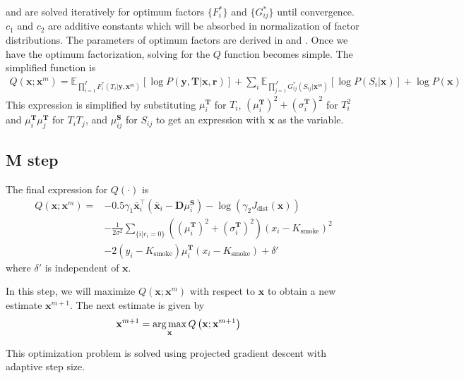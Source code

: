 and  are solved iteratively for optimum factors $ \lbrace F_i^* \rbrace $ and $ \lbrace G_{ij}^* \rbrace $ until convergence. $c_1$ and $c_2$ are additive constants which will be absorbed in normalization of factor distributions. The parameters of optimum factors are derived in  and .  Once we have the optimum factorization, solving for the $Q$ function becomes simple. The simplified function is
\begin{align}
Q(\mathbf{x}; \mathbf{x}^m) = \mathbb{E}_{ \prod_{i=1}^{I} F^*_i (T_i | \mathbf{y}, \mathbf{x}^m) } \left[ \log P \left( \mathbf{y}, \mathbf{T} | \mathbf{x}, \mathbf{r} \right) \right] + \sum_i \mathbb{E}_{ \prod_{j=1}^{J} G^*_{ij} \left( S_{ij} | \mathbf{x}^m \right) } \left[ \log P \left( S_i | \mathbf{x} \right) \right] + \log P \left( \mathbf{x} \right)
\end{align}
This expression is simplified by substituting $\mu^\mathbf{T}_i$ for $T_i$, $\left( \mu^\mathbf{T}_i \right)^2 + \left( \sigma^\mathbf{T}_i \right)^2$ for $T_i^2$ and $\mu^\mathbf{T}_i \mu^\mathbf{T}_j $ for $T_i T_j$, and $\mu^\mathbf{S}_{ij}$ for $S_{ij}$ to get an expression with $\mathbf{x}$ as the variable.


\subsection{M step}
The final expression for $Q \left( \cdot \right)$ is
\begin{equation}
\begin{split}
Q\left( \mathbf{x}; \mathbf{x}^m \right) =  &-0.5 \gamma_1 \mathbf{\bar{x}}^\intercal_i \left( \mathbf{\bar{x}}_i -  \mathbf{D} \mu^\mathbf{S}_i \right) - \log \left( \gamma_2 J_\text{dist}\left( \mathbf{x} \right) \right) \\
&- \frac{1}{2 \sigma^2} \sum_{\{i | r_i = 0 \}}  \left(
\left(\mu^\mathbf{T}_i\right)^2 + \left(\sigma^\mathbf{T}_i\right)^2\right) \left(x_i - K_\text{smoke}\right)^2 \\
&- 2 \left(y_i - K_\text{smoke}\right) \mu^\mathbf{T}_i \left(x_i - K_\text{smoke} \right) + \delta'
\end{split}
\end{equation}
where $\delta'$ is independent of $\mathbf{x}$.

In this step, we will maximize $Q(\mathbf{x}; \mathbf{x}^m)$ with respect to $\mathbf{x}$ to obtain a new estimate $\mathbf{x}^{m+1}$. The next estimate is given by
\begin{align}
    \mathbf{x}^{m+1} &= \operatorname*{arg\,max}_{\mathbf{x}} Q \left( \mathbf{x}; \mathbf{x}^{m+1} \right) \label{eqn:mStep}
\end{align}

This optimization problem is solved using projected gradient descent with adaptive step size.



